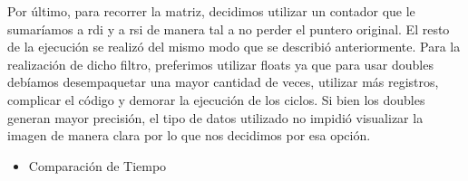 \documentclass[10pt, a4paper]{article}
\begin{document}
\begin{itemize}
Por último, para recorrer la matriz, decidimos utilizar un contador que le sumaríamos a rdi y a rsi de manera tal a no perder el puntero original. El resto de la ejecución se realizó del mismo modo que se describió anteriormente.\newline
Para la realización de dicho filtro, preferimos utilizar floats ya que para usar doubles debíamos desempaquetar una mayor cantidad de veces, utilizar más registros, complicar el código y demorar la ejecución de los ciclos. Si bien los doubles generan mayor precisión, el tipo de datos utilizado no impidió visualizar la imagen de manera clara por lo que nos decidimos por esa opción.

\begin{itemize}
\item{Comparación de Tiempo}
\end{itemize}


\end{itemize}
\end{document}
